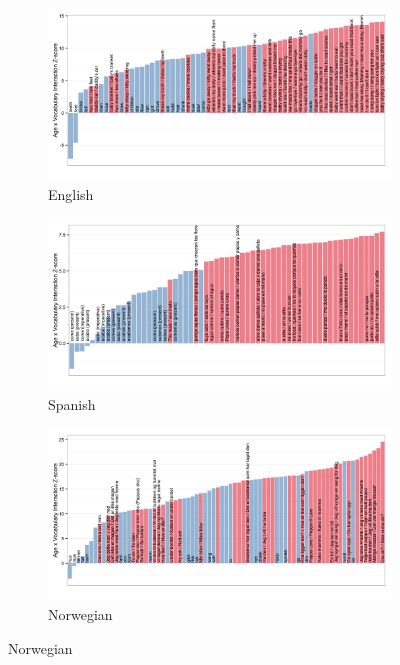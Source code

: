 \documentclass[10pt,letterpaper]{article}
\begin{document}
\begin{figure}[!tbh]
\centering

\begin{subfigure}[b]{\linewidth}
\includegraphics[width=\textwidth]{plots/english_interactions}
\caption{English}
\end{subfigure}

\vfill

\begin{subfigure}[b]{\linewidth}
\includegraphics[width=\textwidth]{plots/spanish_interactions}
\caption{Spanish}
\end{subfigure}

\vfill

\begin{subfigure}[b]{\linewidth}
\includegraphics[width=\textwidth]{plots/norwegian_interactions}
\caption{Norwegian}
\end{subfigure}


\end{figure}
\end{document}
